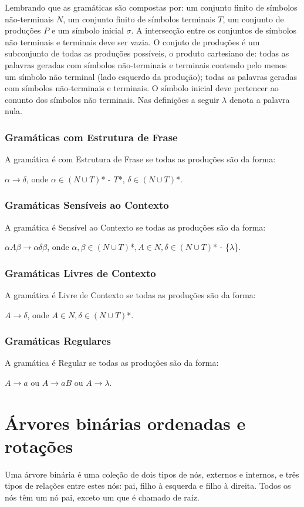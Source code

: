 Lembrando que as gramáticas são compostas por: um conjunto finito de símbolos não-terminais $N$, um conjunto finito de símbolos terminais $T$, um conjunto de produções $P$ e um símbolo inicial $\sigma$. A intersecção entre os conjuntos de símbolos não terminais e terminais deve ser vazia. O conjuto de produções é um subconjunto de todas as produções possíveis, o produto cartesiano de: todas as palavras geradas com símbolos não-terminais e terminais contendo pelo menos um símbolo não terminal (lado esquerdo da produção); todas as palavras geradas com símbolos não-terminais e terminais. O símbolo inicial deve pertencer ao conunto dos símbolos não terminais. Nas definições a seguir $\lambda$ denota a palavra nula. \cite{chomClass}

\subsection{Gramáticas com Estrutura de Frase}
A gramática é com Estrutura de Frase se todas as produções são da forma:

$\alpha \to \delta$, onde $\alpha \in (N \cup T)$* - $T$*, $\delta \in (N \cup T)$*.

\subsection{Gramáticas Sensíveis ao Contexto}
A gramática é Sensível ao Contexto se todas as produções são da forma:

$\alpha A\beta \to \alpha \delta \beta$, onde $\alpha,\beta \in (N \cup T)$*$, A \in N, \delta \in (N \cup T)$* - \{$\lambda$\}.

\subsection{Gramáticas Livres de Contexto}
A gramática é Livre de Contexto se todas as produções são da forma:

$A \to \delta$, onde $A \in N, \delta \in (N \cup T)$*.

\subsection{Gramáticas Regulares}
A gramática é Regular se todas as produções são da forma:

$A \to a$ ou $A \to aB$ ou $A \to \lambda$.

\chapter{Árvores binárias ordenadas e rotações}
Uma árvore binária é uma coleção de dois tipos de nós, externos e internos, e três tipos de relações entre estes nós: pai, filho à esquerda e filho à direita. Todos os nós têm um nó pai, exceto um que é chamado de raíz. \cite{binTree}

